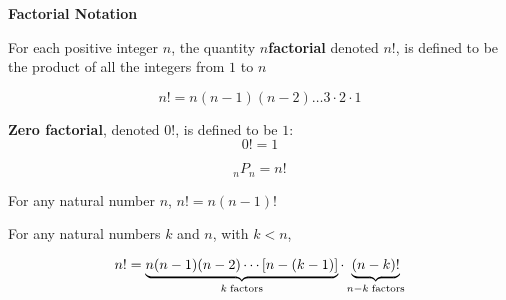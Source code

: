 {\bf Factorial Notation}
\vskip 6pt

For each positive integer $n$, the quantity $n${\bf factorial} denoted $n!$, is defined to be the product of all the integers from $1$ to $n$

$$n!=n(n-1)(n-2)\ldots 3\cdot 2\cdot 1$$

{\bf Zero factorial}, denoted $0!$, is defined to be $1$: $$0!=1$$

\vskip 1cm
$${}_nP_n=n!$$

\vskip 1cm
For any natural number $n$, $n!=n(n-1)!$

\vskip 1cm
For any natural numbers $k$ and $n$, with $k<n$,

$$n!=\underbrace{n(n-1)(n-2)\cdots \lbrack n- (k-1)\rbrack}_{k\rm\;factors} \cdot \underbrace{(n-k)!}_{n-k\rm\; factors}$$


\vfill\eject
